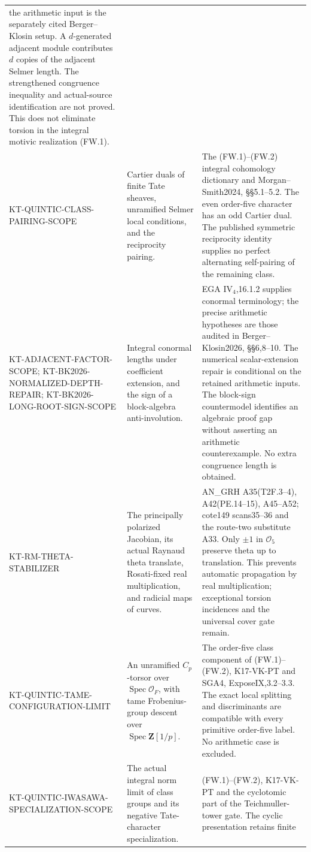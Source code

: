 \documentclass[11pt,a4paper]{article}
\theoremstyle{definition}
\begin{document}
\begin{longtable}{>{\raggedright\arraybackslash}p{}
>{\raggedright\arraybackslash}p{}
>{\raggedright\arraybackslash}p{}}
the arithmetic input is the separately cited Berger--Klosin setup.
A $d$-generated adjacent module contributes $d$ copies of the
adjacent Selmer length. The strengthened congruence inequality
and actual-source identification are not proved. This does not
eliminate torsion in the integral motivic realization (FW.1).\\
KT-QUINTIC-CLASS-PAIRING-SCOPE &
Cartier duals of finite Tate sheaves, unramified Selmer local
conditions, and the reciprocity pairing. &
The (FW.1)--(FW.2) integral cohomology dictionary and
Morgan--Smith2024, \S\S5.1--5.2.
The even order-five character has an odd Cartier dual.
The published symmetric reciprocity identity supplies no
perfect alternating self-pairing of the remaining class.\\
KT-ADJACENT-FACTOR-SCOPE;
KT-BK2026-NORMALIZED-DEPTH-REPAIR;
KT-BK2026-LONG-ROOT-SIGN-SCOPE &
Integral conormal lengths under coefficient extension,
and the sign of a block-algebra anti-involution. &
EGA IV$_4$,16.1.2 supplies conormal terminology;
the precise arithmetic hypotheses are those audited in
Berger--Klosin2026, \S\S6,8--10.
The numerical scalar-extension repair is conditional on
the retained arithmetic inputs. The block-sign countermodel
identifies an algebraic proof gap without asserting an
arithmetic counterexample. No extra congruence length is obtained.\\
KT-RM-THETA-STABILIZER &
The principally polarized Jacobian, its actual Raynaud theta
translate, Rosati-fixed real multiplication, and radicial
maps of curves. &
AN\_GRH A35(T2F.3--4), A42(PE.14--15), A45--A52;
cote149 scans35--36 and the route-two substitute A33.
Only $\pm1$ in $\mathcal O_5$ preserve theta up to translation.
This prevents automatic propagation by real multiplication;
exceptional torsion incidences and the universal cover gate remain.\\
KT-QUINTIC-TAME-CONFIGURATION-LIMIT &
An unramified $C_p$-torsor over $\operatorname{Spec}\mathcal O_F$,
with tame Frobenius-group descent over $\operatorname{Spec}\mathbf Z[1/p]$. &
The order-five class component of (FW.1)--(FW.2),
K17-VK-PT and SGA4, ExposeIX,3.2--3.3.
The exact local splitting and discriminants are compatible
with every primitive order-five label. No arithmetic case is excluded.\\
KT-QUINTIC-IWASAWA-SPECIALIZATION-SCOPE &
The actual integral norm limit of class groups and its
negative Tate-character specialization. &
(FW.1)--(FW.2), K17-VK-PT and the cyclotomic part of the
Teichmuller-tower gate. The cyclic presentation retains finite

\end{longtable}
\end{document}
